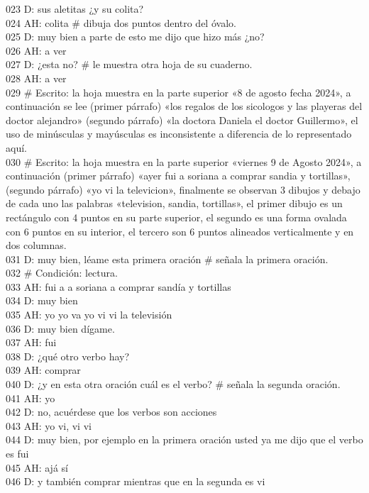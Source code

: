 023 D: sus aletitas ¿y su colita?\\
024 AH: colita \# dibuja dos puntos dentro del óvalo.\\
025 D: muy bien a parte de esto me dijo que hizo más ¿no?\\
026 AH: a ver\\
027 D: ¿esta no? \# le muestra otra hoja de su cuaderno.\\
028 AH: a ver\\
029 \# Escrito: la hoja muestra en la parte superior «8 de agosto fecha 2024», a continuación se lee (primer párrafo) «los regalos de los sicologos y las playeras del doctor alejandro» (segundo párrafo) «la doctora Daniela el doctor Guillermo», el uso de minúsculas y mayúsculas es inconsistente a diferencia de lo representado aquí.\\
030 \# Escrito: la hoja muestra en la parte superior «viernes 9  de Agosto 2024», a continuación (primer párrafo) «ayer fui a soriana a comprar sandia y tortillas», (segundo párrafo) «yo vi la televicion», finalmente se observan 3 dibujos y debajo de cada uno las palabras «television, sandia, tortillas», el primer dibujo es un rectángulo con 4 puntos en su parte superior, el segundo es una forma ovalada con 6 puntos en su interior, el tercero son 6 puntos alineados verticalmente y en dos columnas.\\
031 D: muy bien, léame esta primera oración \# señala la primera oración.\\
032 \# Condición: lectura.\\
033 AH: fui a a soriana a comprar sandía y tortillas\\
034 D: muy bien\\
035 AH: yo yo va yo vi vi la televisión\\
036 D: muy bien dígame.\\
037 AH: fui\\
038 D: ¿qué otro verbo hay?\\
039 AH: comprar\\
040 D: ¿y en esta otra oración cuál es el verbo? \# señala la segunda oración.\\
041 AH: yo\\
042 D: no, acuérdese que los verbos son acciones\\
043 AH: yo vi, vi vi\\
044 D: muy bien, por ejemplo en la primera oración usted ya me dijo que el verbo es fui\\
045 AH: ajá sí\\
046 D: y también comprar mientras que en la segunda es vi\\
